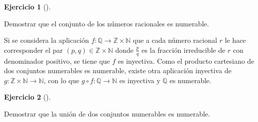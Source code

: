 \documentclass[
  a4paper,
]{scrreport}
\theoremstyle{definition}
\newtheorem{exercise}{Ejercicio}[chapter]
\theoremstyle{remark}
\begin{document}
\leavevmode{}%
\begin{exercise}[]\label{exr-racionales-numerables}

Demostrar que el conjunto de los números racionales es numerable.

\end{exercise}

\begin{tcolorbox}[enhanced jigsaw, coltitle=black, left=2mm, opacityback=0, colback=white, opacitybacktitle=0.6, breakable, colbacktitle=quarto-callout-tip-color!10!white, leftrule=.75mm, toptitle=1mm, arc=.35mm, bottomtitle=1mm, rightrule=.15mm, titlerule=0mm, title=\textcolor{quarto-callout-tip-color}{\faLightbulb}\hspace{0.5em}{Solución}, colframe=quarto-callout-tip-color-frame, toprule=.15mm, bottomrule=.15mm]
Si se considera la aplicación
\(f:\mathbb{Q}\to \mathbb{Z}\times \mathbb{N}\) que a cada número
racional \(r\) le hace corresponder el par
\((p,q)\in \mathbb{Z}\times \mathbb{N}\) donde \(\frac{p}{q}\) es la
fracción irreducible de \(r\) con denominador positivo, se tiene que
\(f\) es inyectiva. Como el producto cartesiano de dos conjuntos
numerables es numerable, existe otra aplicación inyectiva de
\(g:\mathbb{Z}\times \mathbb{N}\to \mathbb{N}\), con lo que
\(g\circ f:\mathbb{Q}\to\mathbb{N}\) es inyectiva y \(\mathbb{Q}\) es
numerable.
\end{tcolorbox}

\leavevmode{}%
\begin{exercise}[]\label{exr-union-numerables}

Demostrar que la unión de dos conjuntos numerables es numerable.

\end{exercise}
\end{document}
